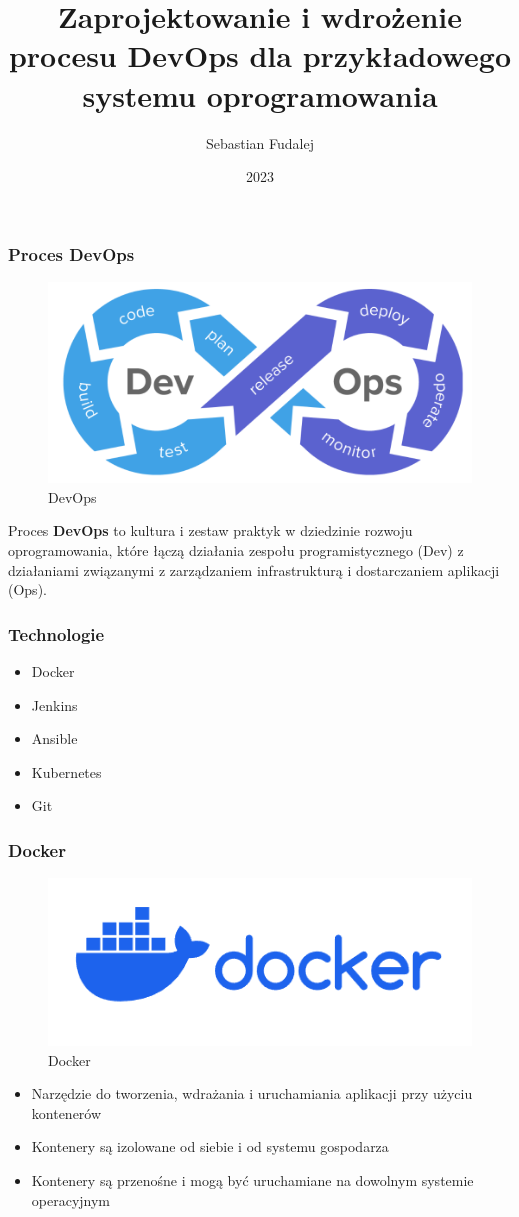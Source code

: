 \documentclass[polish]{beamer}
\title{Zaprojektowanie i wdrożenie procesu DevOps dla przykładowego systemu oprogramowania}
\author{Sebastian Fudalej}
\institute{Politechnika Opolska}
\date{2023}
\begin{document}
\frame{\titlepage}

\begin{frame}
    \justifying
    \frametitle{Proces DevOps}
    \begin{figure}
        \includegraphics[width=0.5\linewidth]{images/devops.png}
        \caption{DevOps}
        \label{fig:devops}
    \end{figure}
    Proces \textbf{DevOps} to kultura i zestaw praktyk w dziedzinie rozwoju oprogramowania, które łączą działania zespołu programistycznego (Dev) z działaniami związanymi z zarządzaniem infrastrukturą i dostarczaniem aplikacji (Ops).
\end{frame}

\begin{frame}
    \frametitle{Technologie}
    \justifying
    \begin{itemize}
        \item Docker
        \item Jenkins
        \item Ansible
        \item Kubernetes
        \item Git
    \end{itemize}
\end{frame}

\begin{frame}
    \frametitle{Docker}
    \justifying
    \begin{figure}
        \includegraphics[width=0.5\linewidth]{images/docker_logo.png}
        \caption{Docker}
        \label{fig:docker}
    \end{figure}
    \begin{itemize}
        \item Narzędzie do tworzenia, wdrażania i uruchamiania aplikacji przy użyciu kontenerów
        \item Kontenery są izolowane od siebie i od systemu gospodarza
        \item Kontenery są przenośne i mogą być uruchamiane na dowolnym systemie operacyjnym
    \end{itemize}

\end{frame}
\end{document}
